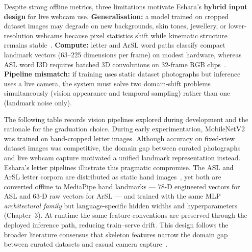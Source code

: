 \noindent Despite strong offline metrics, three limitations motivate Eshara's \textbf{hybrid input design} for live webcam use. \textbf{Generalisation:} a model trained on cropped dataset images may degrade on new backgrounds, skin tones, jewellery, or lower-resolution webcams because pixel statistics shift while kinematic structure remains stable~\cite{zhang2020mediapipe}. \textbf{Compute:} letter and ArSL word paths classify compact landmark vectors (63--225 dimensions per frame) on modest hardware, whereas ASL word I3D requires batched 3D convolutions on 32-frame RGB clips~\cite{sandler2018mobilenetv2,li2020wlasl}. \textbf{Pipeline mismatch:} if training uses static dataset photographs but inference uses a live camera, the system must solve two domain-shift problems simultaneously (vision appearance and temporal sampling) rather than one (landmark noise only).\par\vspace{0.2cm}

\noindent The following table records vision pipelines explored during development and the rationale for the graduation choice. During early experimentation, MobileNetV2 was trained on hand-cropped letter images. Although accuracy on fixed-view dataset images was competitive, the domain gap between curated photographs and live webcam capture motivated a unified landmark representation instead. Eshara's letter pipelines illustrate this pragmatic compromise. The ASL and ArSL letter corpora are distributed as static hand images~\cite{akash2019aslalphabet,arthur2018arasl2018}, yet both are converted offline to MediaPipe hand landmarks --- 78-D engineered vectors for ASL and 63-D raw vectors for ArSL --- and trained with the same MLP \emph{architectural family} but language-specific hidden widths and hyperparameters (Chapter~3). At runtime the same feature conventions are preserved through the deployed inference path, reducing train--serve drift. This design follows the broader literature consensus that skeleton features narrow the domain gap between curated datasets and casual camera capture~\cite{zhang2020mediapipe,rastgoo2021survey,adaloglou2022comprehensive,deng2024skeleton}.\par\vspace{0.2cm}

